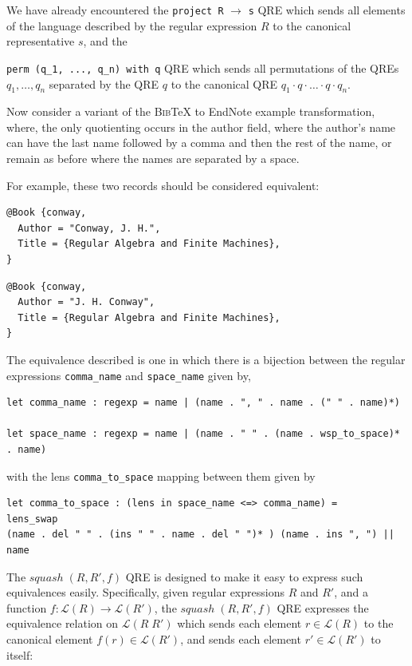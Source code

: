 \documentclass{svproc}
\newcommand{\cd}[1]{\lstinline[backgroundcolor=\color{white}]$#1$}
\newcommand{\squash}[3]{\ensuremath{\mathit{squash} \; (#1, #2, #3)}}
\newcommand{\bibtex}{\textsc{Bib}\TeX{}}
\begin{document}
We have already encountered the \cd{project R} $\to$ \cd{s} QRE
which sends all elements of the language described by the regular expression
$R$ to the canonical representative $s$, and the

\noindent \cd{perm (q_1, ..., q_n) with q} QRE which sends all permutations of
the QREs $q_1, \ldots, q_n$ separated by the QRE $q$ to the canonical
QRE $q_1 \cdot q \cdot \ldots \cdot q \cdot q_n$.

Now consider a variant of the \bibtex{} to EndNote example transformation,
where, the only quotienting occurs in the author field, where the author's name
can have the last name followed by a comma and then the rest of the name, or
remain as before where the names are separated by a space.

For example, these two records should be considered equivalent:
\begin{verbatim}
@Book {conway,
  Author = "Conway, J. H.",
  Title = {Regular Algebra and Finite Machines},
}
\end{verbatim}
\begin{verbatim}
@Book {conway,
  Author = "J. H. Conway",
  Title = {Regular Algebra and Finite Machines},
}
\end{verbatim}

The equivalence described is one in which there is a bijection between 
the regular expressions \cd{comma_name} and \cd{space_name} given by,
\begin{lstlisting}
let comma_name : regexp = name | (name . ", " . name . (" " . name)*)

let space_name : regexp = name | (name . " " . (name . wsp_to_space)* . name)

\end{lstlisting}

\noindent with the lens \cd{comma_to_space} mapping between them given by 
\begin{lstlisting}
let comma_to_space : (lens in space_name <=> comma_name) =
lens_swap 
(name . del " " . (ins " " . name . del " ")* ) (name . ins ", ") || name 
\end{lstlisting}

The $\squash{R}{R'}{f}$ QRE is designed to make it easy to express such
equivalences easily. Specifically, given regular expressions $R$ and $R'$, and
a function $f : \mathcal{L}(R) \longrightarrow \mathcal{L}(R')$, the
$\squash{R}{R'}{f}$ QRE expresses the equivalence relation on $\mathcal{L}(R \;
R')$ which sends each element $r \in \mathcal{L}(R)$ to the canonical element
$f(r) \in \mathcal{L}(R')$, and sends each element $r' \in \mathcal{L}(R')$ to
itself:
\end{document}
